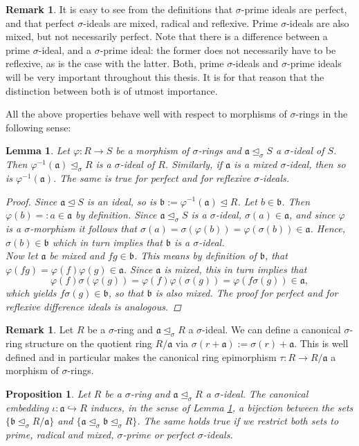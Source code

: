 \documentclass{article}
\def\a{\mathfrak{a}}
\def\b{\mathfrak{b}}
\def\s{\sigma}
\def\si{\unlhd_{\sigma}}
\newenvironment{bew}{\begin{proof}[Proof]}{\end{proof}}
\theoremstyle{plain}
\newtheorem{prop}[Satz]{Proposition}
\newtheorem{lem}[Satz]{Lemma}
\theoremstyle{definition}
\newtheorem{rem}[Satz]{Remark}
\begin{document}
\begin{rem}
It is easy to see from the definitions that $\s$-prime ideals are perfect, and that perfect $\s$-ideals are mixed, radical and reflexive. Prime $\s$-ideals are also mixed, but not necessarily perfect. Note that there is a difference between a prime $\s$-ideal, and a $\s$-prime ideal:
the former does not necessarily have to be reflexive, as is the case with the latter. Both, prime $\s$-ideals and $\s$-prime ideals will be very important throughout this thesis. It is for that reason that the distinction between both is of utmost importance.
\end{rem}

All the above properties behave well with respect to morphisms of $\s$-rings in the following sense:
\begin{lem}\label{bijmapping}
Let $\varphi: R \rightarrow S$ be a morphism of $\s$-rings and $\a \si S$ a $\s$-ideal of $S$. Then $\varphi^{-1}(\a) \si R$ is a $\s$-ideal of $R$. Similarly, if $\a$ is a mixed $\s$-ideal, then so is $\varphi^{-1}(\a)$. The same is true for perfect and for reflexive $\s$-ideals.
\begin{bew}
Since $\a \unlhd S$ is an ideal, so is $\b := \varphi^{-1}(\a) \unlhd R$. Let $b \in \b$. Then $\varphi(b) =: a \in \a$ by definition. Since $\a \si S$ is a $\s$-ideal, $\s(a) \in \a$, and since $\varphi$ is a $\s$-morphism
it follows that $\sigma(a) = \sigma(\varphi(b)) = \varphi (\s (b)) \in \a$. Hence, $\s(b) \in \b$ which in turn implies that $\b$ is a $\s$-ideal. \\
\indent Now let $\a$ be mixed and $fg \in \b$. This means by definition of $\b$, 
that $\varphi(fg) = \varphi(f) \varphi(g) \in \a$. Since $\a$ is mixed, this in turn implies that $$\varphi(f) \s( \varphi(g)) = \varphi(f) \varphi(\s(g)) = \varphi(f\s(g)) \in \a,$$ which yields $f\s(g) \in \b$, so that $\b$ is also mixed. 
The proof for perfect and for reflexive difference ideals is analogous.
\end{bew}
\end{lem}

\begin{rem}
Let $R$ be a $\s$-ring and $\a \si R$ a $\s$-ideal. We can define a canonical $\s$-ring structure on the quotient ring $R/\a$ via $\s(r+\a):= \s(r) + \a$. 
This is well defined and in particular makes the canonical ring epimorphism $\tau: R \rightarrow R/\a$ a morphism of $\s$-rings.
\end{rem}

\begin{prop}\label{bijideals}
Let $R$ be a $\s$-ring and $\a \si R$ a $\s$-ideal. The canonical embedding $\iota: \a \hookrightarrow R$ induces, in the sense of Lemma \ref{bijmapping}, a bijection between the sets $\{ \b \si R/\a \}$ and $\{ \a \si \b \si R \}$. The same holds true if we restrict both sets to prime, radical and mixed, $\s$-prime or perfect $\s$-ideals.
\end{prop}
\end{document}
